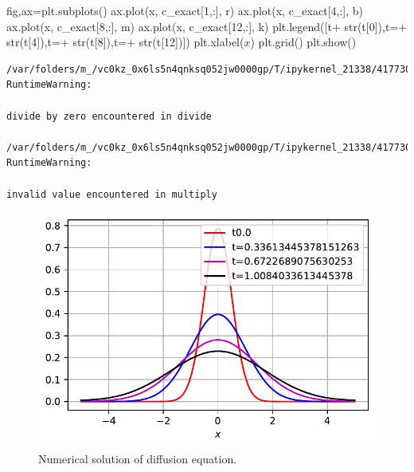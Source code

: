 \documentclass[
  letterpaper,
  DIV=11,
  numbers=noendperiod]{scrreprt}
\newenvironment{Shaded}{\begin{snugshade}}{\end{snugshade}}
\newcommand{\BuiltInTok}[1]{\textcolor[rgb]{0.00,0.23,0.31}{#1}}
\newcommand{\DecValTok}[1]{\textcolor[rgb]{0.68,0.00,0.00}{#1}}
\newcommand{\NormalTok}[1]{\textcolor[rgb]{0.00,0.23,0.31}{#1}}
\newcommand{\OperatorTok}[1]{\textcolor[rgb]{0.37,0.37,0.37}{#1}}
\newcommand{\StringTok}[1]{\textcolor[rgb]{0.13,0.47,0.30}{#1}}
\theoremstyle{plain}
\theoremstyle{definition}
\theoremstyle{plain}
\theoremstyle{remark}
\begin{document}
\begin{Shaded}
\begin{Highlighting}[]
\NormalTok{fig,ax}\OperatorTok{=}\NormalTok{plt.subplots()}
\NormalTok{ax.plot(x, c\_exact[}\DecValTok{1}\NormalTok{,:], }\StringTok{\textquotesingle{}r\textquotesingle{}}\NormalTok{)}
\NormalTok{ax.plot(x, c\_exact[}\DecValTok{4}\NormalTok{,:], }\StringTok{\textquotesingle{}b\textquotesingle{}}\NormalTok{)}
\NormalTok{ax.plot(x, c\_exact[}\DecValTok{8}\NormalTok{,:], }\StringTok{\textquotesingle{}m\textquotesingle{}}\NormalTok{)}
\NormalTok{ax.plot(x, c\_exact[}\DecValTok{12}\NormalTok{,:], }\StringTok{\textquotesingle{}k\textquotesingle{}}\NormalTok{)}
\NormalTok{plt.legend([}\StringTok{\textquotesingle{}t\textquotesingle{}}\OperatorTok{+} \BuiltInTok{str}\NormalTok{(t[}\DecValTok{0}\NormalTok{]),}\StringTok{\textquotesingle{}t=\textquotesingle{}}\OperatorTok{+} \BuiltInTok{str}\NormalTok{(t[}\DecValTok{4}\NormalTok{]),}\StringTok{\textquotesingle{}t=\textquotesingle{}}\OperatorTok{+} \BuiltInTok{str}\NormalTok{(t[}\DecValTok{8}\NormalTok{]),}\StringTok{\textquotesingle{}t=\textquotesingle{}}\OperatorTok{+} \BuiltInTok{str}\NormalTok{(t[}\DecValTok{12}\NormalTok{])])}
\NormalTok{plt.xlabel(}\StringTok{\textquotesingle{}$x$\textquotesingle{}}\NormalTok{)}
\NormalTok{plt.grid()}
\NormalTok{plt.show()}
\end{Highlighting}
\end{Shaded}

\begin{verbatim}
/var/folders/m_/vc0kz_0x6ls5n4qnksq052jw0000gp/T/ipykernel_21338/4177307358.py:42: RuntimeWarning:

divide by zero encountered in divide

/var/folders/m_/vc0kz_0x6ls5n4qnksq052jw0000gp/T/ipykernel_21338/4177307358.py:42: RuntimeWarning:

invalid value encountered in multiply
\end{verbatim}

\begin{figure}[H]

{\centering \includegraphics{linearreactiondiffusion_files/figure-pdf/fig-diffusionpde-output-2.pdf}

}

\caption{\label{fig-diffusionpde}Numerical solution of diffusion
equation.}

\end{figure}
\end{document}
